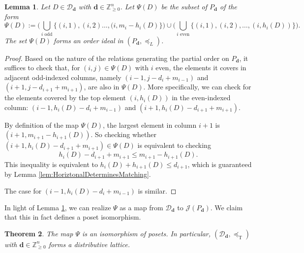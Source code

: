 \documentclass{amsart}
\newtheorem{theorem}{Theorem}[section]
\newtheorem{lemma}[theorem]{Lemma}
\theoremstyle{definition}
\newcommand{\leqt}{\preceq_{\text{T}}}
\begin{document}
\begin{lemma}\label{lem:CanDefineMapPsi}
Let $D \in \mathcal{D}_{\mathbf{d}}$ with $\mathbf{d}\in\mathbb{Z}_{\ge 0}^n$. Let $\Psi(D)$ be the subset of $P_{\mathbf{d}}$ of the form \[
\Psi(D):=\bigg(\bigcup_{i \text{ odd}}\{(i,1), (i,2) \ldots, (i,m_i - h_i(D)\}\bigg) \cup \bigg( \bigcup_{i \text{ even}}\{(i,1),(i,2),\ldots,(i,h_i(D))\}\bigg).
\]
The set $\Psi(D)$ forms an order ideal in $(P_{\mathbf{d}},\preceq_L)$.
\end{lemma}

\begin{proof}
Based on the nature of the relations generating the partial order on $P_{\mathbf{d}}$, it suffices to check that, for
$(i,j)\in\Psi(D)$ with $i$ even, the elements it covers
in adjacent odd-indexed columns, namely $(i-1,j-d_{i}+m_{i-1})$
and $(i+1,j-d_{i+1}+m_{i+1})$, are also in $\Psi(D)$.
More specifically, we can check for the elements covered by
the top element $(i,h_i(D))$ in the even-indexed column:
$(i-1,h_i(D) - d_{i} + m_{i-1})$ and $(i+1,h_i(D) - d_{i+1} + m_{i+1})$. 

By definition of the map $\Psi(D)$, the largest element in column $i+1$ is $(i+1,m_{i+1}-h_{i+1}(D))$. So checking whether $(i+1,h_i(D) - d_{i+1} + m_{i+1}) \in \Psi(D)$ is equivalent to checking \[
h_i(D) - d_{i+1} + m_{i+1} \leq m_{i+1} - h_{i+1}(D).
\]
This inequality is equivalent to $h_i(D) + h_{i+1}(D) \leq d_{i+1}$, which is guaranteed by Lemma \ref{lem:HoriztonalDeterminesMatching}.

The case for $(i-1,h_i(D) - d_{i} + m_{i-1})$ is similar.
 \end{proof}

 In light of Lemma \ref{lem:CanDefineMapPsi}, we can realize $\Psi$ as a map from $\mathcal{D}_{\mathbf{d}}$ to $\mathcal{J}(P_{\mathbf{d}})$. We claim that this in fact defines a poset isomorphism.

 \begin{theorem}\label{thm:dlattice}
The map $\Psi$ is an isomorphism of posets. In particular, $(\mathcal{D}_{\mathbf{d}},\leqt)$ with $\mathbf{d}\in\mathbb{Z}_{\ge 0}^n$ forms a distributive lattice.
 \end{theorem}
\end{document}
